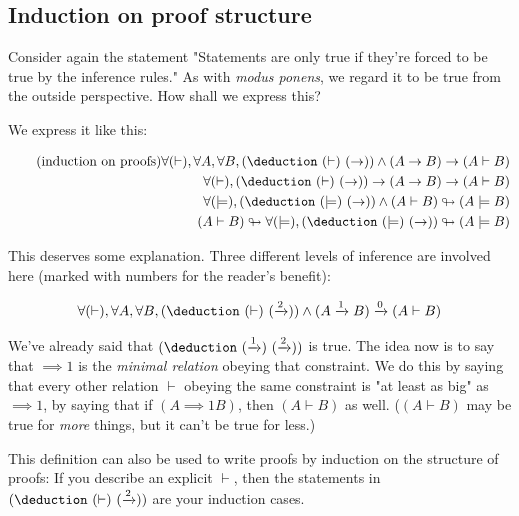 \documentclass{article}
\begin{document}
  \subsection{Induction on proof structure}
  
  Consider again the statement "Statements are only true if they're forced to be true by the inference rules." As with \emph{modus ponens}, we regard it to be true from the outside perspective. How shall we express this?
  
  We express it like this:
  
  \begin{align*}
    \tag{induction on proofs}\label{inp}
    \forall (\vdash), \forall A,\forall B,  (\deduction\ (\vdash)\ (\to)) \wedge (A \to B) \to (A \vdash B)\\
    \forall (\vdash), (\deduction\ (\vdash)\ (\to)) \to (A \to B) \to (A \vdash B)\\
    \forall (\models), (\deduction\ (\models)\ (\to)) \wedge (A \vdash B) \looparrowright (A \models B)\\
    (A \vdash B) \looparrowright \forall (\models), (\deduction\ (\models)\ (\to)) \looparrowright (A \models B)\\
  \end{align*}
  
  This deserves some explanation. Three different levels of inference are involved here (marked with numbers for the reader's benefit):
  
  \begin{align*}
    \forall (\vdash), \forall A,\forall B,  (\deduction\ (\vdash)\ (\implies{2})) \wedge (A \implies{1} B) \implies{0} (A \vdash B)\\
  \end{align*}
  
  We've already said that $(\deduction\ (\implies{1})\ (\implies{2}))$ is true. The idea now is to say that $\implies{1}$ is the \emph{minimal relation} obeying that constraint. We do this by saying that every other relation $\vdash$ obeying the same constraint is "at least as big" as $\implies{1}$, by saying that if $(A \implies{1} B)$, then $(A \vdash B)$ as well. ($(A \vdash B)$ may be true for \emph{more} things, but it can't be true for less.)
  
  This definition can also be used to write proofs by induction on the structure of proofs: If you describe an explicit $\vdash$, then the statements in $(\deduction\ (\vdash)\ (\implies{2}))$ are your induction cases.
  
\end{document}
